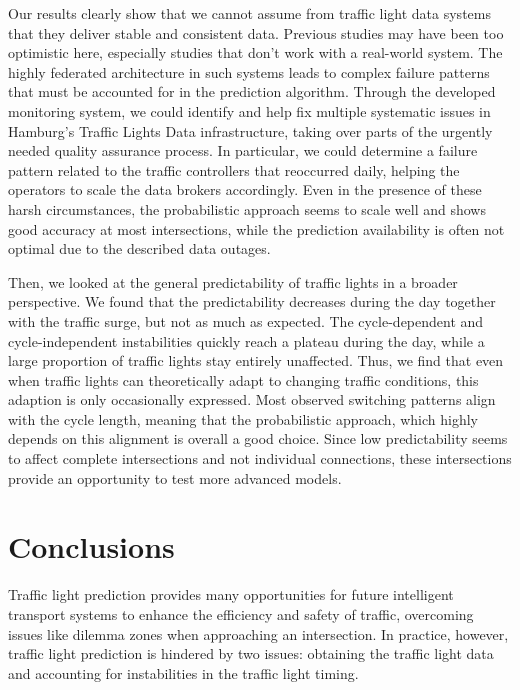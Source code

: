 \begin{Summary}
Our results clearly show that we cannot assume from traffic light data systems that they deliver stable and consistent data. Previous studies may have been too optimistic here, especially studies that don’t work with a real-world system. The highly federated architecture in such systems leads to complex failure patterns that must be accounted for in the prediction algorithm. Through the developed monitoring system, we could identify and help fix multiple systematic issues in Hamburg’s Traffic Lights Data infrastructure, taking over parts of the urgently needed quality assurance process. In particular, we could determine a failure pattern related to the traffic controllers that reoccurred daily, helping the operators to scale the data brokers accordingly. Even in the presence of these harsh circumstances, the probabilistic approach seems to scale well and shows good accuracy at most intersections, while the prediction availability is often not optimal due to the described data outages.

Then, we looked at the general predictability of traffic lights in a broader perspective. We found that the predictability decreases during the day together with the traffic surge, but not as much as expected. The cycle-dependent and cycle-independent instabilities quickly reach a plateau during the day, while a large proportion of traffic lights stay entirely unaffected. Thus, we find that even when traffic lights can theoretically adapt to changing traffic conditions, this adaption is only occasionally expressed. Most observed switching patterns align with the cycle length, meaning that the probabilistic approach, which highly depends on this alignment is overall a good choice. Since low predictability seems to affect complete intersections and not individual connections, these intersections provide an opportunity to test more advanced models.
\end{Summary}

\section{Conclusions}

Traffic light prediction provides many opportunities for future intelligent transport systems to enhance the efficiency and safety of traffic, overcoming issues like dilemma zones when approaching an intersection. In practice, however, traffic light prediction is hindered by two issues: obtaining the traffic light data and accounting for instabilities in the traffic light timing. 

